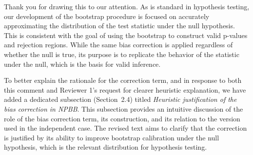 \documentclass[12pt]{article}
\begin{document}
Thank you for drawing this to our attention. As is standard in hypothesis 
testing, our development of the bootstrap procedure is focused on accurately 
approximating the distribution of the test statistic under the null hypothesis. 
This is consistent with the goal of using the bootstrap to construct valid
 p-values and rejection regions. While the same bias correction is applied 
regardless of whether the null is true, its purpose is to replicate the 
behavior of the statistic under the null, which is the basis for valid inference.


To better explain the rationale for the correction term, and in response to both 
this comment and Reviewer 1’s request for clearer heuristic explanation, we have 
added a dedicated subsection (Section~2.4) titled \emph{Heuristic justification 
of the bias correction in NPBB}. This subsection provides an intuitive discussion 
of the role of the bias correction term, its construction, and its relation to 
the version used in the independent case. The revised text aims to clarify that 
the correction is justified by its ability to improve bootstrap calibration under 
the null hypothesis, which is the relevant distribution for hypothesis testing.




\end{document}
